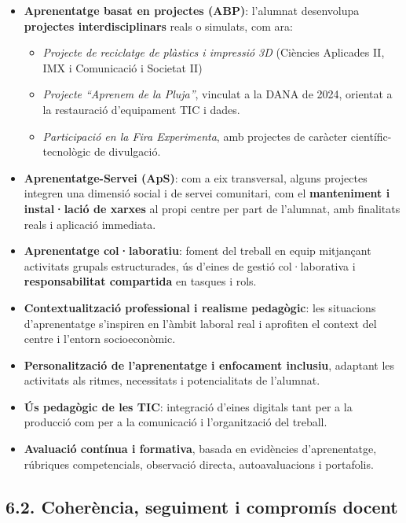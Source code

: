 \documentclass[
  paper=a4,
  ,captions=tableheading
]{scrartcl}
\providecommand{\tightlist}{%
  \setlength{\itemsep}{0pt}\setlength{\parskip}{0pt}}
\begin{document}
\begin{itemize}
\tightlist
\item
  \textbf{Aprenentatge basat en projectes (ABP)}: l'alumnat desenvolupa
  \textbf{projectes interdisciplinars} reals o simulats, com ara:

  \begin{itemize}
  \tightlist
  \item
    \emph{Projecte de reciclatge de plàstics i impressió 3D} (Ciències
    Aplicades II, IMX i Comunicació i Societat II)
  \item
    \emph{Projecte ``Aprenem de la Pluja''}, vinculat a la DANA de 2024,
    orientat a la restauració d'equipament TIC i dades.
  \item
    \emph{Participació en la Fira Experimenta}, amb projectes de
    caràcter científic-tecnològic de divulgació.
  \end{itemize}
\item
  \textbf{Aprenentatge-Servei (ApS)}: com a eix transversal, alguns
  projectes integren una dimensió social i de servei comunitari, com el
  \textbf{manteniment i instal·lació de xarxes} al propi centre per part
  de l'alumnat, amb finalitats reals i aplicació immediata.
\item
  \textbf{Aprenentatge col·laboratiu}: foment del treball en equip
  mitjançant activitats grupals estructurades, ús d'eines de gestió
  col·laborativa i \textbf{responsabilitat compartida} en tasques i
  rols.
\item
  \textbf{Contextualització professional i realisme pedagògic}: les
  situacions d'aprenentatge s'inspiren en l'àmbit laboral real i
  aprofiten el context del centre i l'entorn socioeconòmic.
\item
  \textbf{Personalització de l'aprenentatge i enfocament inclusiu},
  adaptant les activitats als ritmes, necessitats i potencialitats de
  l'alumnat.
\item
  \textbf{Ús pedagògic de les TIC}: integració d'eines digitals tant per
  a la producció com per a la comunicació i l'organització del treball.
\item
  \textbf{Avaluació contínua i formativa}, basada en evidències
  d'aprenentatge, rúbriques competencials, observació directa,
  autoavaluacions i portafolis.
\end{itemize}

\hypertarget{coheruxe8ncia-seguiment-i-compromuxeds-docent}{%
\subsection{6.2. Coherència, seguiment i compromís
docent}\label{coheruxe8ncia-seguiment-i-compromuxeds-docent}}
\end{document}
